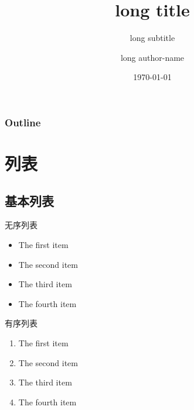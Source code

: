 \documentclass[UTF8,14pt,aspectratio=43,dvipsnames,svgnames,x11names,hyperref={urlcolor=blue}]{beamer}
\title[short title]{long title}
\subtitle[short subtitle]{long subtitle}
\institute[short institute-name]{long institute-name}
\author[short author-name]{long author-name}
\date[\today]{\today}
\begin{document}
\frame[plain]{\titlepage}

\begin{frame}\frametitle{Outline}
	\begin{footnotesize}
	\tableofcontents  %
	\end{footnotesize}
\end{frame}

\section{列表}

\subsection{基本列表} %
	\begin{frame}[t]{无序列表}  
	\begin{itemize}
		\item The first item
		\item The second item
		\item The third item
		\item The fourth item
	\end{itemize}
	\end{frame}


	\begin{frame}{有序列表}
		\begin{enumerate}
			\item The first item
			\item The second item
			\item The third item
			\item The fourth item
		\end{enumerate}
	\end{frame}
\end{document}
